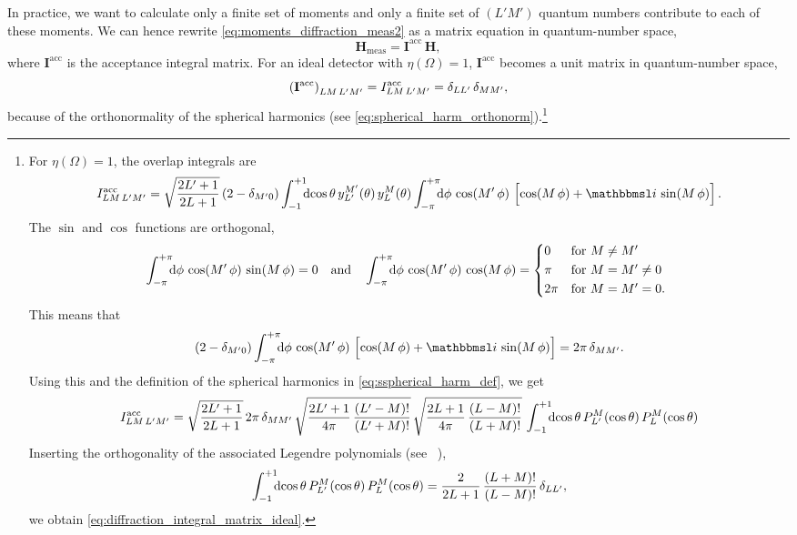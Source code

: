 In practice, we want to calculate only a finite set of moments and
only a finite set of $(L' M')$ quantum numbers contribute to each of
these moments.  We can hence rewrite
\cref{eq:moments_diffraction_meas2} as a matrix equation in
quantum-number space, \ie
\begin{equation}
  \mathbf{H}_\text{meas}
  = \mathbf{I}^\text{acc}\, \mathbf{H},
\end{equation}
where $\mathbf{I}^\text{acc}$ is the acceptance integral matrix.  For
an ideal detector with $\eta(\Omega) = 1$, $\mathbf{I}^\text{acc}$
becomes a unit matrix in quantum-number space, \ie
\begin{equation}
  \label{eq:diffraction_integral_matrix_ideal}
  \rBrk{\mathbf{I}^\text{acc}}_{L M\, L' M'}
  = I^\text{acc}_{L M\, L' M'}
  = \delta_{L L'}\, \delta_{M M'},
\end{equation}
because of the orthonormality of the spherical harmonics (see
\cref{eq:spherical_harm_orthonorm}).\footnote{%
  For $\eta(\Omega) = 1$, the overlap integrals are
  \begin{equation}
    I^\text{acc}_{L M\, L' M'}
    = \sqrt{\frac{2 L' + 1}{2 L + 1}}\, (2 - \delta_{M' 0})
    \int_{-1}^{+1}\!\!\! \dif{\cos\theta}\, y_{L'}^{M'}(\theta)\, y_L^M(\theta)
    \int_{-\pi}^{+\pi}\!\!\! \dif{\phi}\, \cos(M'\, \phi)\, \sBrk[2]{\cos(M\, \phi) + \imag\, \sin(M\, \phi)}.
  \end{equation}
  The $\sin$ and $\cos$ functions are orthogonal, \ie
  \begin{equation}
    \int_{-\pi}^{+\pi}\!\!\! \dif{\phi}\, \cos(M'\, \phi)\, \sin(M\, \phi)
    = 0
    \quad\text{and}\quad
    \int_{-\pi}^{+\pi}\!\!\! \dif{\phi}\, \cos(M'\, \phi)\, \cos(M\, \phi)
    = \begin{cases*}
      0    & for $M \neq M'$ \\
      \pi  & for $M = M' \neq 0$ \\
      2\pi & for $M = M' = 0$.
    \end{cases*}
  \end{equation}
  This means that
  \begin{equation}
    (2 - \delta_{M' 0})
    \int_{-\pi}^{+\pi}\!\!\! \dif{\phi}\, \cos(M'\, \phi)\, \sBrk[2]{\cos(M\, \phi) + \imag\, \sin(M\, \phi)}
    = 2 \pi\, \delta_{M M'}.
  \end{equation}
  Using this and the definition of the spherical harmonics in
  \cref{eq:sspherical_harm_def}, we get
  \begin{equation}
    I^\text{acc}_{L M\, L' M'}
    = \sqrt{\frac{2 L' + 1}{2 L + 1}}\, 2 \pi\, \delta_{M M'}\,
    \sqrt{\frac{2 L' + 1}{4 \pi}\, \frac{(L' - M)!}{(L' + M)!}}\,
    \sqrt{\frac{2 L + 1}{4 \pi}\, \frac{(L - M)!}{(L + M)!}}\,
    \int_{-1}^{+1}\!\!\! \dif{\cos\theta}\, P_{L'}^M(\cos\theta)\, P_L^M(\cos\theta)
  \end{equation}
  Inserting the orthogonality of the associated Legendre polynomials
  (see \eg\ ), \ie
  \begin{equation}
    \int_{-1}^{+1}\!\!\! \dif{\cos\theta}\, P_{L'}^M(\cos\theta)\, P_L^M(\cos\theta)
    = \frac{2}{2 L + 1}\, \frac{(L + M)!}{(L - M)!}\, \delta_{L L'},
  \end{equation}
  we obtain \cref{eq:diffraction_integral_matrix_ideal}.
}
